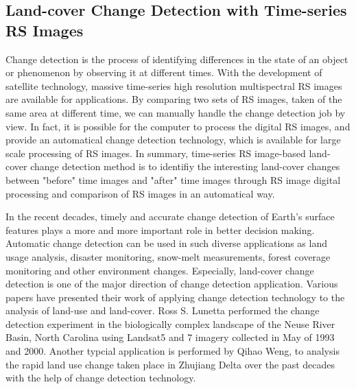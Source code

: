 \documentclass{elsart}
\begin{document}
\subsection{Land-cover Change Detection with Time-series RS Images}
Change detection is the process of identifying differences in the state of an object or phenomenon by observing it at different times\cite{SINGH1989}.
With the development of satellite technology, massive time-series high resolution multispectral RS images are available for applications.  
By comparing two sets of RS images, taken of the same area at different time, we can manually handle the change detection job by view.
In fact, it is possible for the computer to process the digital RS images, and provide an automatical change detection technology, which is available for large scale processing of RS images.
In summary, time-series RS image-based land-cover change detection method is to identifiy the interesting land-cover changes between "before" time images and "after" time images through RS image digital processing and comparison of RS images in an automatical way.
\par

In the recent decades, timely and accurate change detection of Earth's surface features plays a more and more important role in better decision making.
Automatic change detection can be used in such diverse applications as land usage analysis, disaster monitoring, snow-melt measurements, forest coverage monitoring and other environment changes. 
Especially, land-cover change detection is one of the major direction of change detection application. 
Various papers\cite{Weng2002}\cite{Read2002}\cite{Lunetta2002} have presented their work of applying change detection technology to the analysis of land-use and land-cover. 
Ross S. Lunetta\cite{Lunetta2002} performed the change detection experiment in the biologically complex landscape of the Neuse River Basin, North Carolina using Landsat5 and 7 imagery collected in May of 1993 and 2000. 
Another typcial application is performed by Qihao Weng\cite{Weng2002}, to analysis the rapid land use change taken place in Zhujiang Delta over the past decades with the help of change detection technology.
\end{document}
